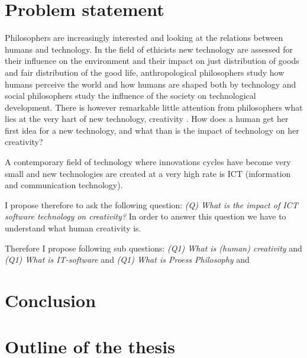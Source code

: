 \section{Problem statement}

Philosophers are increasingly interested and looking at the relations between humans and technology. 
In the field of ethicists new technology are assessed for their influence on the environment and their impact on just distribution of goods and fair distribution of the good life,  anthropological philosophers study how humans perceive the world and how humans are shaped both by technology and social philosophers study the influence of the society on technological development.
There is however remarkable little attention from philosophers what lies at the very hart of new technology, creativity \cite{gaut2010philosophy}. How does a human get her first idea for a new technology, and what than is the impact of technology on her creativity?

A contemporary field of technology where innovations cycles have become very small and new technologies are created at a very high rate is ICT (information and communication technology).

I propose therefore to ask the following question:
\textit{(Q) What is the impact of ICT software technology on creativity?}
In order to answer this question we have to understand what human creativity is. 

Therefore I propose following sub questions:
\textit{(Q1) What is (human) creativity} and  
\textit{(Q1) What is IT-software} and  
\textit{(Q1) What is Proess Philosophy} and  

\section{Conclusion}

\section{Outline of the thesis}
